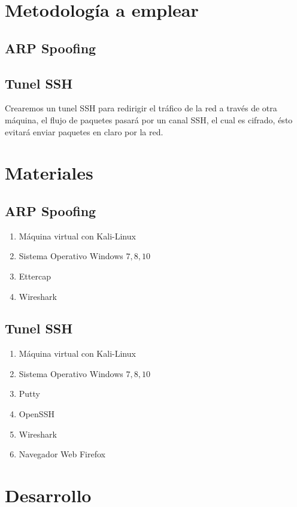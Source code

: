 \documentclass{article}
\begin{document}
\section{Metodolog\'ia a emplear}
\subsection{ARP Spoofing}

\subsection{Tunel SSH}
Crearemos un tunel SSH para redirigir el tr\'afico de la red a trav\'es de otra m\'aquina, el flujo de paquetes pasar\'a por un canal SSH, el cual es cifrado, \'esto evitar\'a enviar paquetes en claro por la red.

\section{Materiales}

\subsection{ARP Spoofing}
\begin{enumerate}
\item M\'aquina virtual con Kali-Linux
\item Sistema Operativo Windows \(7,8,10\)
\item Ettercap
\item Wireshark
\end{enumerate}

\subsection{Tunel SSH}
\begin{enumerate}
\item M\'aquina virtual con Kali-Linux
\item Sistema Operativo Windows \(7,8,10\)
\item Putty
\item OpenSSH
\item Wireshark
\item Navegador Web Firefox
\end{enumerate}

\section{Desarrollo}
\end{document}
